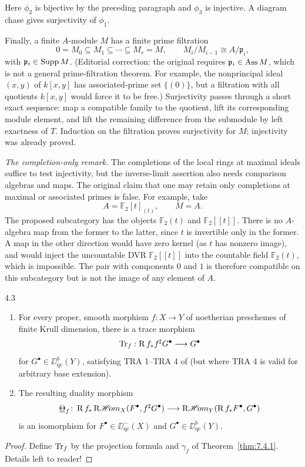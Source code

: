 Here $\phi_2$ is bijective by the preceding paragraph and $\phi_3$ is injective. A diagram chase gives surjectivity of $\phi_1$.\par
Finally, a finite $A$-module $M$ has a finite prime filtration
\[
0=M_0\subseteq M_1\subseteq\cdots\subseteq M_r=M,
\qquad M_i/M_{i-1}\cong A/\mathfrak p_i,
\]
with $\mathfrak p_i\in\operatorname{Supp} M$. (Editorial correction: the original requires $\mathfrak p_i\in\operatorname{Ass} M$, which is not a general prime-filtration theorem. For example, the nonprincipal ideal $(x,y)$ of $k[x,y]$ has associated-prime set $\{(0)\}$, but a filtration with all quotients $k[x,y]$ would force it to be free.)
Surjectivity passes through a short exact sequence: map a compatible family to the quotient, lift its corresponding module element, and lift the remaining difference from the submodule by left exactness of $T$. Induction on the filtration proves surjectivity for $M$; injectivity was already proved.

\noindent\textit{The completion-only remark.} The completions of the local rings at maximal ideals suffice to test injectivity, but the inverse-limit assertion also needs comparison algebras and maps. The original claim that one may retain only completions at maximal or associated primes is false. For example, take
\[
A=\mathbb F_2[t]_{(t)},\qquad M=A.
\]
The proposed subcategory has the objects $\mathbb F_2(t)$ and $\mathbb F_2[[t]]$. There is no $A$-algebra map from the former to the latter, since $t$ is invertible only in the former. A map in the other direction would have zero kernel (as $t$ has nonzero image), and would inject the uncountable DVR $\mathbb F_2[[t]]$ into the countable field $\mathbb F_2(t)$, which is impossible. The pair with components $0$ and $1$ is therefore compatible on this subcategory but is not the image of any element of $A$.

\begin{bookcorollary}{4.3}\label{cor:7.4.3}
\begin{enumerate}
\item[(a)] For every proper, smooth morphism $f: X \to Y$ of noetherian preschemes of finite Krull dimension, there is a trace morphism
\[
\operatorname{Tr}_{f} : \operatorname{R} f_{*} f^{\sharp} G^{\bullet} \longrightarrow G^{\bullet}
\]
for $G^{\bullet} \in \DD_{\mathrm{qc}}^{b}(Y)$, satisfying TRA 1--TRA 4 of  (but where TRA 4 is valid for arbitrary base extension).

\item[(b)] The resulting duality morphism
\[
\underline{\Theta}_{f} \colon \operatorname{R} f_{*} \mathop{\mathrm{R}\mathscr{H}\!om}\nolimits_X(F^{\bullet}, f^{\sharp}G^{\bullet}) \longrightarrow \mathop{\mathrm{R}\mathscr{H}\!om}\nolimits_Y(\operatorname{R} f_{*}F^{\bullet}, G^{\bullet})
\]
is an isomorphism for $F^{\bullet} \in \DD_{\mathrm{qc}}^{-}(X)$ and $G^{\bullet} \in \DD_{\mathrm{qc}}^{b}(Y)$.
\end{enumerate}
\end{bookcorollary}

\begin{proof}
Define $\operatorname{Tr}_{f}$ by the projection formula  and $\gamma_f$ of Theorem~\ref{thm:7.4.1}. Details left to reader!
\end{proof}
